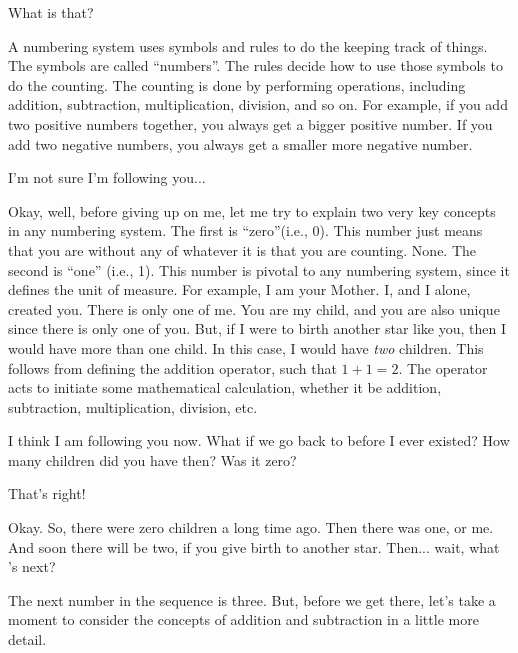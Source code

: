 \documentclass[main.tex]{subfiles}
\begin{document}
\par \Maia What is that?

\par \Pleione A numbering system uses symbols and rules to do the keeping track of things.  The symbols are called ``numbers''.  The rules decide how to use those symbols to do the counting.  The counting is done by performing operations, including addition, subtraction, multiplication, division, and so on.  For example, if you add two positive numbers together, you always get a bigger positive number.  If you add two negative numbers, you always get a smaller more negative number.  

\par \Maia I'm not sure I'm following you...

\par \Pleione Okay, well, before giving up on me, let me try to explain two very key concepts in any numbering system.  The first is ``zero''(i.e., 0).  This number just means that you are without any of whatever it is that you are counting.  None.  The second is ``one'' (i.e., 1).  This number is pivotal to any numbering system, since it defines the unit of measure.  For example, I am your Mother.  I, and I alone, created you.  There is only one of me.  You are my child, and you are also unique since there is only one of you.  But, if I were to birth another star like you, then I would have more than one child.  In this case, I would have \textit{two} children.  This follows from defining the addition operator, such that $1 + 1 = 2$.  The operator acts to initiate some mathematical calculation, whether it be addition, subtraction, multiplication, division, etc.

\par \Maia I think I am following you now.  What if we go back to before I ever existed?  How many children did you have then?  Was it zero?

\par \Pleione That's right!

\par \Maia Okay.  So, there were zero children a long time ago.  Then there was one, or me.  And soon there will be two, if you give birth to another star.  Then... wait, what 's next?

\par \Pleione The next number in the sequence is three.  But, before we get there, let's take a moment to consider the concepts of addition and subtraction in a little more detail.
\end{document}
